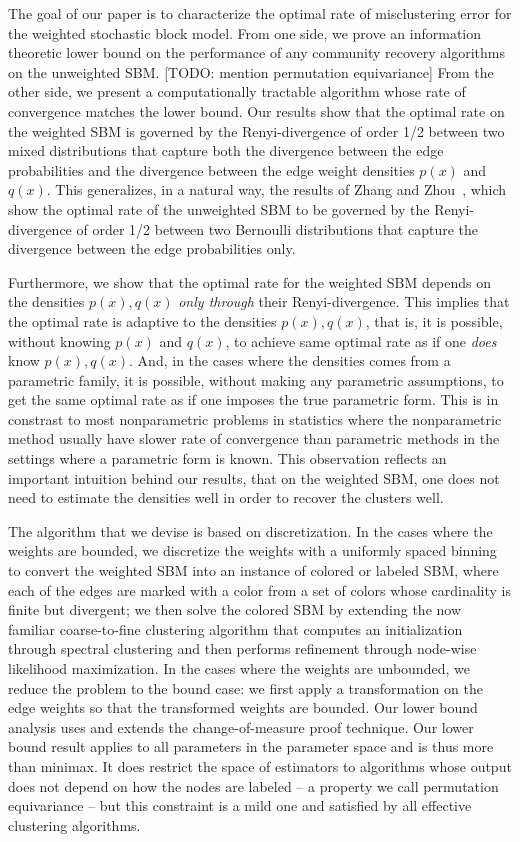 \documentclass{article}
\begin{document}
The goal of our paper is to characterize the optimal rate of misclustering error for the weighted stochastic block model. From one side, we prove an information theoretic lower bound on the performance of any community recovery algorithms on the unweighted SBM. [TODO: mention permutation equivariance] From the other side, we present a computationally tractable algorithm whose rate of convergence matches the lower bound. Our results show that the optimal rate on the weighted SBM is governed by the Renyi-divergence of order 1/2 between two mixed distributions that capture both the divergence between the edge probabilities and the divergence between the edge weight densities $p(x)$ and $q(x)$. This generalizes, in a natural way, the results of Zhang and Zhou~\cite{zhangminimax}, which show the optimal rate of the unweighted SBM to be governed by the Renyi-divergence of order 1/2 between two Bernoulli distributions that capture the divergence between the edge probabilities only. 

Furthermore, we show that the optimal rate for the weighted SBM depends on the densities $p(x), q(x)$ \emph{only through} their Renyi-divergence. This implies that the optimal rate is adaptive to the densities $p(x), q(x)$, that is, it is possible, without knowing $p(x)$ and $q(x)$, to achieve same optimal rate as if one \emph{does} know $p(x), q(x)$. And, in the cases where the densities comes from a parametric family, it is possible, without making any parametric assumptions, to get the same optimal rate as if one imposes the true parametric form. This is in constrast to most nonparametric problems in statistics where the nonparametric method usually have slower rate of convergence than parametric methods in the settings where a parametric form is known. This observation reflects an important intuition behind our results, that on the weighted SBM, one does not need to estimate the densities well in order to recover the clusters well. 

The algorithm that we devise is based on discretization. In the cases where the weights are bounded, we discretize the weights with a uniformly spaced binning to convert the weighted SBM into an instance of colored or labeled SBM, where each of the edges are marked with a color from a set of colors whose cardinality is finite but divergent; we then solve the colored SBM by extending the now familiar coarse-to-fine clustering algorithm that computes an initialization through spectral clustering and then performs refinement through node-wise likelihood maximization. In the cases where the weights are unbounded, we reduce the problem to the bound case: we first apply a transformation on the edge weights so that the transformed weights are bounded. Our lower bound analysis uses and extends the change-of-measure proof technique. Our lower bound result applies to all parameters in the parameter space and is thus more than minimax. It does restrict the space of estimators to algorithms whose output does not depend on how the nodes are labeled -- a property we call permutation equivariance -- but this constraint is a mild one and satisfied by all effective clustering algorithms. 
\end{document}
